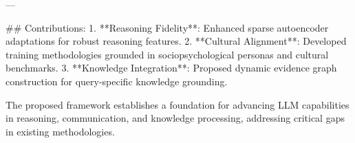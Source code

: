 ---

## Contributions:
1. **Reasoning Fidelity**: Enhanced sparse autoencoder adaptations for robust reasoning features.
2. **Cultural Alignment**: Developed training methodologies grounded in sociopsychological personas and cultural benchmarks.
3. **Knowledge Integration**: Proposed dynamic evidence graph construction for query-specific knowledge grounding.

The proposed framework establishes a foundation for advancing LLM capabilities in reasoning, communication, and knowledge processing, addressing critical gaps in existing methodologies.